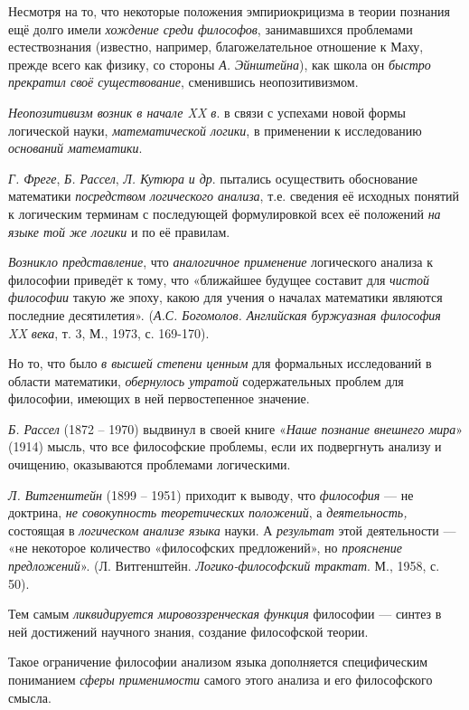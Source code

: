 \documentclass[a4paper,14pt,russian]{extreport}
\begin{document}
Несмотря на то, что некоторые положения эмпириокрицизма в теории познания ещё долго имели \emph{хождение среди философов}, занимавшихся проблемами естествознания (известно, например, благожелательное отношение к Маху, прежде всего как физику, со стороны \emph{А. Эйнштейна}), как школа он \emph{быстро прекратил своё существование}, сменившись неопозитивизмом.

\emph{Неопозитивизм возник в начале XX в}\textsc{.} в связи с успехами новой формы логической науки, \emph{математической логики}, в применении к исследованию \emph{оснований математики}.

\emph{Г. Фреге}, \emph{Б. Рассел}, \emph{Л. Кутюра} \emph{и др}. пытались осуществить обоснование математики \emph{посредством логического анализа}, т.е. сведения её исходных понятий к логическим терминам с последующей формулировкой всех её положений \emph{на языке той же логики} и по её правилам.

\emph{Возникло представление}, что \emph{аналогичное применение} логического анализа к философии приведёт к тому, что «ближайшее будущее составит для \emph{чистой философии} такую же эпоху, какою для учения о началах математики являются последние десятилетия». (\emph{А.С. Богомолов. Английская буржуазная философия XX века}, т. 3, М., 1973, с. 169-170).

Но то, что было \emph{в высшей степени ценным} для формальных исследований в области математики, \emph{обернулось утратой} содержательных проблем для философии, имеющих в ней первостепенное значение.

\emph{Б. Рассел} (1872 -- 1970) выдвинул в своей книге «\emph{Наше познание внешнего мира}» (1914) мысль, что все философские проблемы, если их подвергнуть анализу и очищению, оказываются проблемами логическими.

\emph{Л. Витгенштейн} (1899 -- 1951) приходит к выводу, что \emph{философия} --- не доктрина, \emph{не совокупность теоретических положений}, а \emph{деятельность,} состоящая в \emph{логическом анализе языка} науки. А \emph{результат} этой деятельности --- «не некоторое количество «философских предложений», но \emph{прояснение предложений}». (Л. Витгенштейн. \emph{Логико-философский трактат}. М., 1958, с. 50).

Тем самым \emph{ликвидируется мировоззренческая функция} философии --- синтез в ней достижений научного знания, создание философской теории.

Такое ограничение философии анализом языка дополняется специфическим пониманием \emph{сферы применимости} самого этого анализа и его философского смысла.
\end{document}
